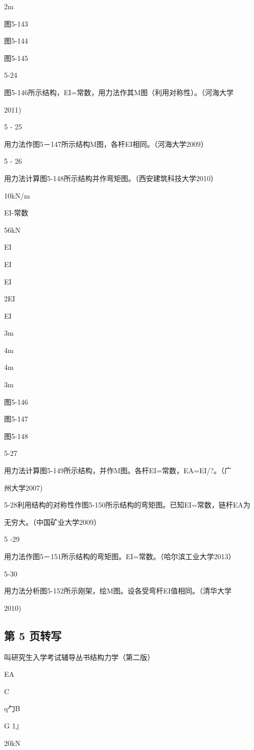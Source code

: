 2m

图5-143

图5-144

图5-145

5-24

图5-146所示结构，EI=常数，用力法作其M图（利用对称性）。（河海大学

2011)

5 - 25

用力法作图5－147所示结构M图，各杆EI相同。（河海大学2009）

5 - 26

用力法计算图5-148所示结构并作弯矩图。（西安建筑科技大学2010）

10kN/m

EI-常数

56kN

EI

EI

EI

2EI

EI

3m

4m

4m

3m

图5-146

图5-147

图5-148

5-27

用力法计算图5-149所示结构，并作M图。各杆EI=常数，EA=EI/?。（广

州大学2007)

5-28利用结构的对称性作图5-150所示结构的弯矩图。已知EI=常数，链杆EA为

无穷大。（中国矿业大学2009）

5 -29

用力法作图5－151所示结构的弯矩图。EI=常数。（哈尔滨工业大学2013）

5-30

用力法分析图5-152所示刚架，绘M图。设各受弯杆EI值相同。（清华大学

2010)

\subsection*{第 5 页转写}
叫研究生入学考试辅导丛书结构力学（第二版）

EA

C

q勹B

G 1』

20kN

